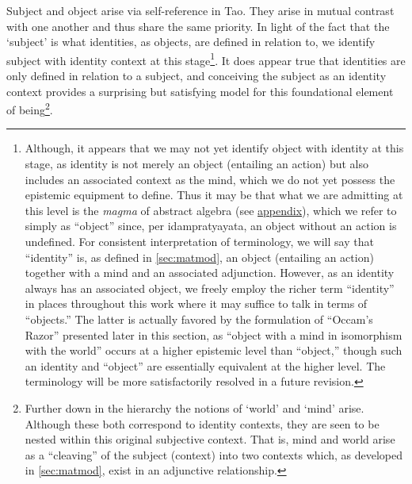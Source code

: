 \documentclass[pra,twocolumn,groupedaddress,10pt]{revtex4}
\theoremstyle{definition}
\begin{document}
\begin{enumerate}[label={[\textbf{\arabic*}]},start=0]
		Subject and object arise via self-reference in Tao. They arise in mutual contrast with one another and thus share the same priority. In light of the fact that the `subject' is what identities, as objects, are defined in relation to, we identify subject with identity context at this stage\footnote{Although, it appears that we may not yet identify object with identity at this stage, as identity is not merely an object (entailing an action) but also includes an associated context as the mind, which we do not yet possess the epistemic equipment to define. Thus it may be that what we are admitting at this level is the \emph{magma} of abstract algebra (see \hyperref[app:algact]{appendix}), which we refer to simply as ``object'' since, per idampratyayata, an object without an action is undefined. For consistent interpretation of terminology, we will say that ``identity'' is, as defined in \autoref{sec:matmod}, an object (entailing an action) together with a mind and an associated adjunction. However, as an identity always has an associated object, we freely employ the richer term ``identity'' in places throughout this work where it may suffice to talk in terms of ``objects.'' The latter is actually favored by the formulation of ``Occam's Razor'' presented later in this section, as ``object with a mind in isomorphism with the world'' occurs at a higher epistemic level than ``object,'' though such an identity and ``object'' are essentially equivalent at the higher level. The terminology will be more satisfactorily resolved in a future revision.}. It does appear true that identities are only defined in relation to a subject, and conceiving the subject as an identity context provides a surprising but satisfying model for this foundational element of being\footnote{Further down in the hierarchy the notions of `world' and `mind' arise. Although these both correspond to identity contexts, they are seen to be nested within this original subjective context. That is, mind and world arise as a ``cleaving'' of the subject (context) into two contexts which, as developed in \autoref{sec:matmod}, exist in an adjunctive relationship.}.


\end{enumerate}
\end{document}
